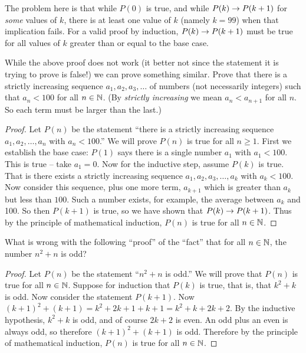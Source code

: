 \begin{questions}
 	\begin{answer}
 		The problem here is that while $P(0)$ is true, and while $P(k) \rightarrow P(k+1)$ for {\em some} values of $k$, there is at least one value of $k$ (namely $k = 99$) when that implication fails.  For a valid proof by induction, $P(k) \rightarrow P(k+1)$ must be true for all values of $k$ greater than or equal to the base case.
 	\end{answer}
 	
 	
 	
 

\question While the above proof does not work (it better not since the statement it is trying to prove is false!)  we can prove something similar.  Prove that there is a strictly increasing sequence $a_1, a_2, a_3, \ldots$ of numbers (not necessarily integers) such that $a_n < 100$ for all $n \in \mathbb N$.  (By {\em strictly increasing} we mean $a_n < a_{n+1}$ for all $n$.  So each term must be larger than the last.)

	\begin{answer}
		\begin{proof}
		 Let $P(n)$ be the statement ``there is a strictly increasing sequence $a_1, a_2, \ldots, a_n$ with $a_n < 100$.''  We will prove $P(n)$ is true for all $n \ge 1$. First we establish the base case: $P(1)$ says there is a single number $a_1$ with $a_1 < 100$.  This is true -- take $a_1 = 0$.  Now for the inductive step, assume $P(k)$ is true.  That is there exists a strictly increasing sequence $a_1, a_2, a_3, \ldots, a_k$ with $a_k < 100$.  Now consider this sequence, plus one more term, $a_{k+1}$ which is greater than $a_k$ but less than $100$.  Such a number exists, for example, the average between $a_k$ and 100.  So then $P(k+1)$ is true, so we have shown that $P(k) \rightarrow P(k+1)$.  Thus by the principle of mathematical induction, $P(n)$ is true for all $n \in \mathbb N$.
		\end{proof}
		
	\end{answer}
	
	
	



\question What is wrong with the following ``proof'' of the ``fact'' that for all $n \in \mathbb N$, the number $n^2 + n$ is odd?
  \begin{proof}
    Let $P(n)$ be the statement ``$n^2 + n$ is odd.''  We will prove that $P(n)$ is true for all $n \in \mathbb N$.  Suppose for induction that $P(k)$ is true, that is, that $k^2 + k$ is odd.  Now consider the statement $P(k+1)$.  Now $(k+1)^2 + (k+1) = k^2 + 2k + 1 + k + 1 = k^2 + k + 2k + 2$.  By the inductive hypothesis, $k^2 + k$ is odd, and of course $2k + 2$ is even.  An odd plus an even is always odd, so therefore $(k+1)^2 + (k+1)$ is odd.  Therefore by the principle of mathematical induction, $P(n)$ is true for all $n \in \mathbb N$.
  \end{proof}
  

\end{questions}
